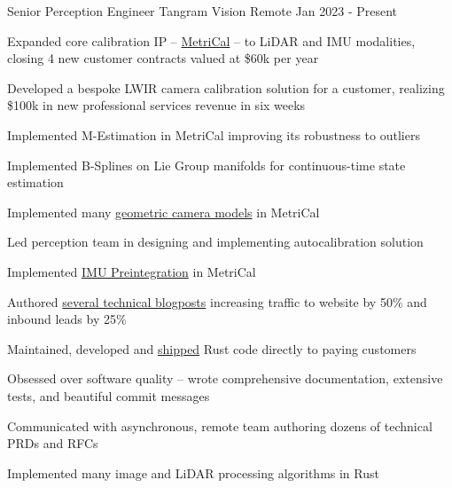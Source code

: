 

\begin{cventries}
  \cventry
    {Senior Perception Engineer}
    {Tangram Vision}
    {Remote}
    {Jan 2023 - Present}
    {
        \begin{cvitems}
            \item{Expanded core calibration IP -- \href{https://docs.tangramvision.com/metrical/intro}{\color{awesome-skyblue}MetriCal} -- to LiDAR and IMU modalities, closing 4 new customer contracts valued at \$60k per year}
            \item{Developed a bespoke LWIR camera calibration solution for a customer, realizing \$100k in new professional services revenue in six weeks}
            \item{Implemented M-Estimation in MetriCal improving its robustness to outliers}
            \item{Implemented B-Splines on Lie Group manifolds for continuous-time state estimation}
            \item{Implemented many \href{https://docs.tangramvision.com/metrical/core_concepts/component_models/cameras/}{\color{awesome-skyblue}geometric camera models} in MetriCal}
            \item{Led perception team in designing and implementing autocalibration solution}
            \item{Implemented \href{https://www.tangramvision.com/blog/imu-preintegration-basics-part-5-of-5}{\color{awesome-skyblue}IMU Preintegration} in MetriCal}
            \item{Authored \href{https://www.tangramvision.com/author/devon-morris}{\color{awesome-skyblue}several technical blogposts} increasing traffic to website by 50\% and inbound leads by 25\%}
            \item{Maintained, developed and \href{https://hubgw.docker.com/r/tangramvision/cli}{\color{awesome-skyblue}shipped} Rust code directly to paying customers}
            \item{Obsessed over software quality -- wrote comprehensive documentation, extensive tests, and beautiful commit messages}
            \item{Communicated with asynchronous, remote team authoring dozens of technical PRDs and RFCs}
            \item{Implemented many image and LiDAR processing algorithms in Rust}
        \end{cvitems}
    }


\end{cventries}
